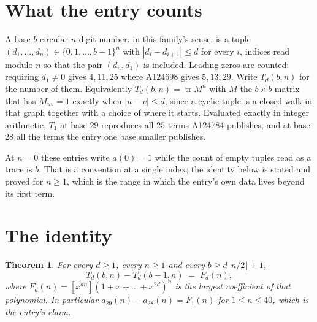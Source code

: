 \documentclass[11pt,a4paper]{article}
\theoremstyle{plain}
\newtheorem{theorem}{Theorem}
\theoremstyle{definition}
\begin{document}
\section{What the entry counts}

A base-$b$ circular $n$-digit number, in this family's sense, is a tuple
$(d_1,\dots,d_n)\in\{0,1,\dots,b-1\}^{n}$ with $|d_i-d_{i+1}|\le d$ for every $i$, indices
read modulo $n$ so that the pair $(d_n,d_1)$ is included. Leading zeros are counted: requiring
$d_1\ne0$ gives $4,11,25$ where A124698 gives $5,13,29$. Write $T_d(b,n)$ for the number of
them. Equivalently $T_d(b,n)=\operatorname{tr}M^{n}$ with $M$ the $b\times b$ matrix that has
$M_{uv}=1$ exactly when $|u-v|\le d$, since a cyclic tuple is a closed walk in that graph
together with a choice of where it starts. Evaluated exactly in integer arithmetic, $T_{1}$
at base $29$ reproduces all $25$ terms A124784 publishes, and at base $28$ all the
terms the entry one base smaller publishes.

At $n=0$ these entries write $a(0)=1$ while the count of empty tuples read as a trace is $b$.
That is a convention at a single index; the identity below is stated and proved for $n\ge1$,
which is the range in which the entry's own data lives beyond its first term.

\section{The identity}

\begin{theorem}
For every $d\ge1$, every $n\ge1$ and every $b\ge d\lfloor n/2\rfloor+1$,
\[
T_d(b,n)-T_d(b-1,n)\;=\;F_d(n),
\]
where $F_d(n)=[x^{dn}](1+x+\dots+x^{2d})^{n}$ is the largest coefficient of that
polynomial. In particular $a_{29}(n)-a_{28}(n)=F_{1}(n)$ for $1\le n\le40$, which
is the entry's claim.
\end{theorem}
\end{document}
